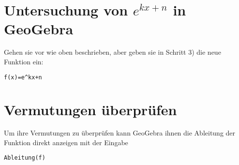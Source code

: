 \documentclass[10pt, a4paper]{scrartcl}
\begin{document}
	\section*{Untersuchung von $e^{kx+n}$ in GeoGebra}
	Gehen sie vor wie oben beschrieben, aber geben sie in Schritt 3) die neue Funktion ein:
	\begin{center}\large
		\verb!f(x)=e^kx+n!
	\end{center}


	\section*{Vermutungen überprüfen}
	\textbf{\llap{\Large\symInfo}\space}Um ihre Vermutungen zu überprüfen kann GeoGebra ihnen die Ableitung der Funktion direkt anzeigen mit der Eingabe
	\begin{center}\large
			\verb!Ableitung(f)!
	\end{center}
\end{document}
